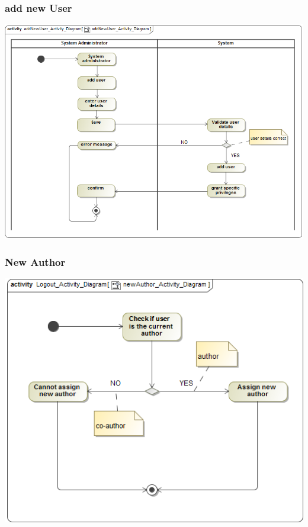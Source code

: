\documentclass[11pt]{article}
\begin{document}
	\newpage
	\subsubsection{add new User}
	\begin{center}
		\includegraphics[width=\textwidth]{../Images/addNewUser_Activity_Diagram.png}\\[0.5cm]
	\end{center}
	
	\newpage
	\subsubsection{New Author}
	\begin{center}
		\includegraphics[width=\textwidth]{../Images/newAuthor_Activity_Diagram.png}\\[0.5cm]
	\end{center}
	
\end{document}
